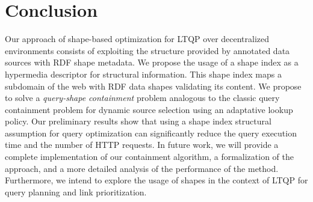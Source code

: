 \section{Conclusion}
Our approach of shape-based optimization for LTQP over decentralized environments consists of exploiting the structure provided by
annotated data sources with RDF shape metadata. 
We propose the usage of a shape index as a hypermedia descriptor for structural information.
This shape index maps a subdomain of the web with RDF data shapes validating its content.
We propose to solve a \emph{query-shape containment} problem analogous to the classic query containment problem for dynamic source selection
using an adaptative lookup policy. 
Our preliminary results show that using a shape index structural assumption for query optimization
can significantly reduce the query execution time and the number of HTTP requests.
In future work, we will provide a complete implementation of our containment algorithm,
a formalization of the approach, and a more detailed analysis of the performance of the method.
Furthermore, we intend to explore the usage of shapes in the context of LTQP for query planning and link prioritization.